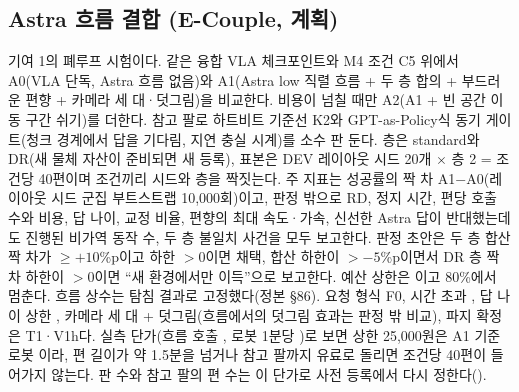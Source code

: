 \subsection{Astra 흐름 결합 (E-Couple, 계획)}
\label{sec:plan_couple}
기여 1의 폐루프 시험이다. 같은 융합 VLA 체크포인트와 M4 조건 C5 위에서 A0(VLA 단독, Astra 흐름 없음)와 A1(Astra low 직렬 흐름 + 두 층 합의 + 부드러운 편향 + 카메라 세 대·덧그림)을 비교한다. 비용이 넘칠 때만 A2(A1 + 빈 공간 이동 구간 쉬기)를 더한다. 참고 팔로 하트비트 기준선 K2와 GPT-as-Policy식 동기 게이트(청크 경계에서 답을 기다림, 지연 충실 시계)를 소수 판 둔다. 층은 standard와 DR(새 물체 자산이 준비되면 새 등록), 표본은 DEV 레이아웃 시드 20개 $\times$ 층 2 = 조건당 40편이며 조건끼리 시드와 층을 짝짓는다. 주 지표는 성공률의 짝 차 A1$-$A0(레이아웃 시드 군집 부트스트랩 10,000회)이고, 판정 밖으로 RD, 정지 시간, 편당 호출 수와 비용, 답 나이, 교정 비율, 편향의 최대 속도·가속, 신선한 Astra 답이 반대했는데도 진행된 비가역 동작 수, 두 층 불일치 사건을 모두 보고한다. 판정 초안은 두 층 합산 짝 차가 $\ge+10$\%p이고 하한 $>0$이면 채택, 합산 하한이 $>-5$\%p이면서 DR 층 짝 차 하한이 $>0$이면 ``새 환경에서만 이득''으로 보고한다. 예산 상한은 이고 80\%에서 멈춘다. 흐름 상수는 탐침 결과로 고정했다(정본 §86). 요청 형식 F0, 시간 초과 , 답 나이 상한 , 카메라 세 대 + 덧그림(흐름에서의 덧그림 효과는 판정 밖 비교), 파지 확정은 T1·V1h다. 실측 단가(흐름 호출 , 로봇 1분당 )로 보면 상한 25,000원은 A1 기준 로봇 이라, 편 길이가 약 1.5분을 넘거나 참고 팔까지 유료로 돌리면 조건당 40편이 들어가지 않는다. 판 수와 참고 팔의 편 수는 이 단가로 사전 등록에서 다시 정한다().

